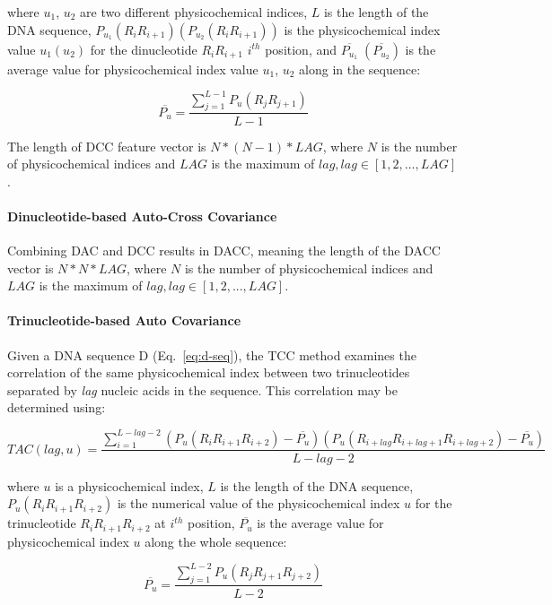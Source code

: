 where $u_{1}$, $u_{2}$ are two different physicochemical indices, $L$ is the length of the \gls{DNA} sequence, $P_{u_{1}}(R_{i}R_{i+1}) (P_{u_{2}}(R_{i}R_{i+1}))$ is the physicochemical index value $u_{1}(u_{2})$ for the dinucleotide $R_{i}R_{i+1}$ $i^{th}$ position, and $\overline{P_{u_{1}}}\;(\overline{P_{u_{2}}})$ is the average value for physicochemical index value $u_{1}$, $u_{2}$ along in the sequence:

\begin{equation}\label{eq:DAC-PU2}
    \overline{P_{u}} = \frac{\sum_{j=1}^{L-1}P_{u}(R_{j}R_{j+1})}{L-1}
\end{equation}

The length of \gls{DCC} feature vector is $N*(N-1)*LAG$, where $N$ is the number of physicochemical indices and $LAG$ is the maximum of $lag, lag \in [1,2,...,LAG]$.

\paragraph{Dinucleotide-based Auto-Cross Covariance}
Combining \gls{DAC} and \gls{DCC} results in \gls{DACC}, meaning the length of the \gls{DACC} vector is $N*N*LAG$, where $N$ is the number of physicochemical indices and $LAG$ is the maximum of $lag, lag \in [1,2,...,LAG]$.


\paragraph{Trinucleotide-based Auto Covariance}
Given a \gls{DNA} sequence D (Eq.~\ref{eq:d-seq}), the \gls{TCC} method examines the correlation of the same physicochemical index between two trinucleotides separated by \textit{lag} nucleic acids in the sequence. This correlation may be determined using:

\begin{equation}\label{eq:tac}
    TAC(lag,u) = 
\frac
{
\sum_{i=1}^{L-lag-2}(P_{u}(R_{i}R_{i+1}R_{i+2}) - \overline{P_{u}})(P_{u}(R_{i+lag}R_{i+lag+1}R_{i+lag+2}) - \overline{P_{u}})
}
{
L-lag-2
}
\end{equation}

where $u$ is a physicochemical index, $L$ is the length of the \gls{DNA} sequence, $P_{u}(R_{i}R_{i+1}R_{i+2})$ is the numerical value of the physicochemical index $u$ for the trinucleotide $R_{i}R_{i+1}R_{i+2}$ at $i^{th}$ position, $\overline{P_{u}}$ is the average value for physicochemical index $u$ along the whole sequence:

\begin{equation}\label{eq:tac-2}
    \overline{P_{u}} = \frac{\sum_{j=1}^{L-2}P_{u}(R_{j}R_{j+1}R_{j+2})}{L-2}
\end{equation}

